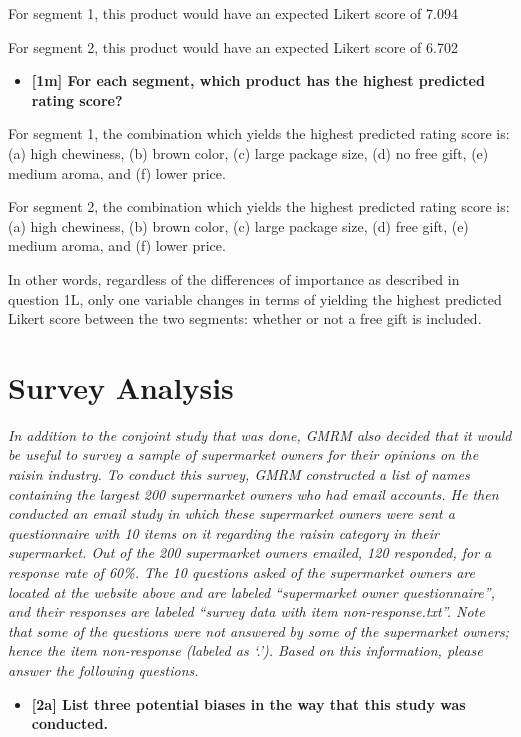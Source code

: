 \documentclass[10pt, oneside,spanish]{article}
\begin{document}
For segment 1, this product would have an expected Likert score of 7.094

For segment 2, this product would have an expected Likert score of 6.702

\begin{itemize}
\item \textbf{[1m]   For each segment, which product has the highest predicted rating score?    }
\end{itemize}

For segment 1, the combination which yields the highest predicted rating score is: (a) high chewiness, (b) brown color, (c) large package size, (d) no free gift, (e) medium aroma, and (f) lower price.

For segment 2, the combination which yields the highest predicted rating score is: (a) high chewiness, (b) brown color, (c) large package size, (d) free gift, (e) medium aroma, and (f) lower price.

In other words, regardless of the differences of importance as described in question 1L, only one variable changes in terms of yielding the highest predicted Likert score between the two segments: whether or not a free gift is included.
\pagebreak


\section{Survey Analysis}

\textit{In addition to the conjoint study that was done, GMRM also decided that it would be useful to survey a sample of supermarket owners for their opinions on the raisin industry.  To conduct this survey, GMRM constructed a list of names containing the largest 200 supermarket owners who had email accounts.  He then conducted an email study in which these supermarket owners were sent a questionnaire with 10 items on it regarding the raisin category in their supermarket.  Out of the 200 supermarket owners emailed, 120 responded, for a response rate of 60\%.  The 10 questions asked of the supermarket owners are located at the website above and are labeled “supermarket owner questionnaire”, and their responses are labeled “survey data with item non-response.txt”.  Note that some of the questions were not answered by some of the supermarket owners; hence the item non-response (labeled as ‘.’).  Based on this information, please answer the following questions.}

\begin{itemize}
\item \textbf{[2a]  List three potential biases in the way that this study was conducted.   }
\end{itemize}
\end{document}
